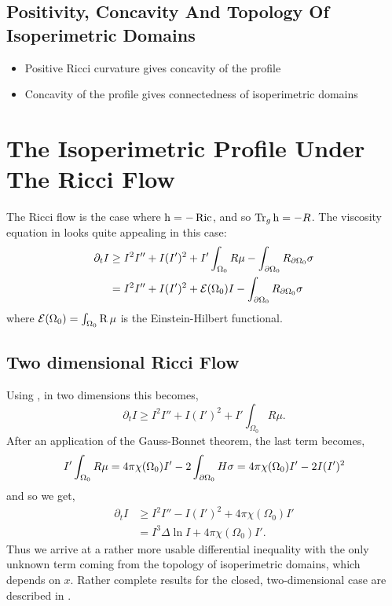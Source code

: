 \documentclass{amsart}
\begin{document}
\subsection{Positivity, Concavity And Topology Of Isoperimetric Domains}

\begin{itemize}
\item Positive Ricci curvature gives concavity of the profile
\item Concavity of the profile gives connectedness of isoperimetric domains
\end{itemize}

\section{The Isoperimetric Profile Under The Ricci Flow}
\label{subsec:flows_ricci}

The Ricci flow is the case where $\operatorname{h} = -\operatorname{Ric}$, and so $\operatorname{Tr}_g \operatorname{h} = -R$. The viscosity equation in  looks quite appealing in this case:
\begin{equation}
\label{eq:viscosity_ricciflow}
\begin{split}
\partial_t I &\geq I^2I'' + I(I')^2 + I'\int_{\Omega_0} R \mu - \int_{\partial {\Omega_0}} R_{\partial {\Omega_0}}\sigma \\
&= I^2I'' + I(I')^2 + \operatorname{\mathcal{E}}(\Omega_0) I - \int_{\partial {\Omega_0}} R_{\partial {\Omega_0}}\sigma
\end{split}
\end{equation}
where \(\operatorname{\mathcal{E}}({\Omega_0}) = \int_{\Omega_0} \operatorname{R} \mu\) is the Einstein-Hilbert functional.

\subsection*{Two dimensional Ricci Flow}

Using , in two dimensions this becomes,
\[
\partial_t I \geq I^2I'' + I(I')^2 + I'\int_{\Omega_0} R \mu.
\]
After an application of the Gauss-Bonnet theorem, the last term becomes,
\[
I'\int_{\Omega_0} R \mu = 4\pi\chi(\Omega_0)I' - 2\int_{\partial {\Omega_0}} H \sigma = 4\pi\chi(\Omega_0)I'- 2 I (I')^2
\]
and so we get,
\begin{equation}
\label{eq:2d_viscosity_ricciflow}
\begin{split}
\partial_t I &\geq I^2I'' - I(I')^2 + 4\pi\chi(\Omega_0)I' \\
&= I^3 \Delta \ln I + 4\pi\chi(\Omega_0)I'.
\end{split}
\end{equation}
Thus we arrive at a rather more usable differential inequality with the only unknown term coming from the topology of isoperimetric domains, which depends on \(x\). Rather complete results for the closed, two-dimensional case are described in \cite{Bryan:/2016,AndrewsBryan:/2010}.
\end{document}
